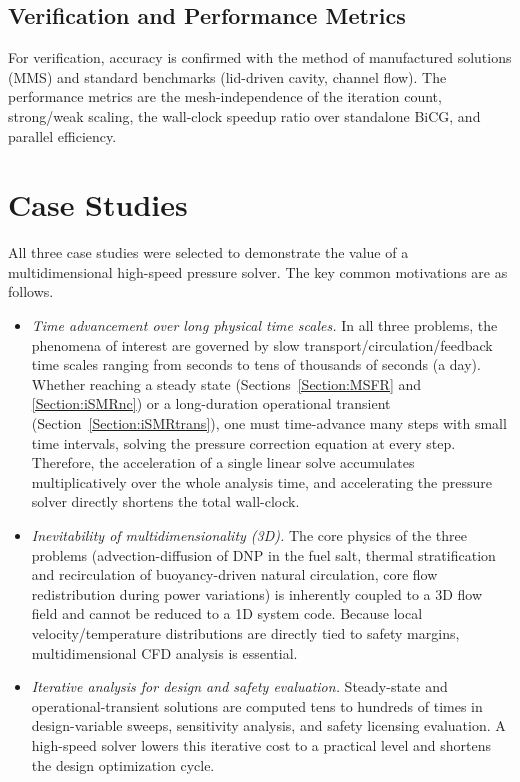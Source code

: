 \documentclass[review]{elsarticle}
\begin{document}
\subsection{Verification and Performance Metrics}
For verification, accuracy is confirmed with the method of manufactured solutions (MMS) and standard benchmarks (lid-driven cavity, channel flow). The performance metrics are the mesh-independence of the iteration count, strong/weak scaling, the wall-clock speedup ratio over standalone BiCG, and parallel efficiency.

\section{Case Studies}
\label{Section:CaseStudies}

All three case studies were selected to demonstrate the value of a multidimensional high-speed pressure solver. The key common motivations are as follows.
\begin{itemize}
  \item \emph{Time advancement over long physical time scales.} In all three problems, the phenomena of interest are governed by slow transport/circulation/feedback time scales ranging from seconds to tens of thousands of seconds (a day). Whether reaching a steady state (Sections~\ref{Section:MSFR} and \ref{Section:iSMRnc}) or a long-duration operational transient (Section~\ref{Section:iSMRtrans}), one must time-advance many steps with small time intervals, solving the pressure correction equation at every step. Therefore, the acceleration of a single linear solve accumulates multiplicatively over the whole analysis time, and accelerating the pressure solver directly shortens the total wall-clock.
  \item \emph{Inevitability of multidimensionality (3D).} The core physics of the three problems (advection-diffusion of DNP in the fuel salt, thermal stratification and recirculation of buoyancy-driven natural circulation, core flow redistribution during power variations) is inherently coupled to a 3D flow field and cannot be reduced to a 1D system code. Because local velocity/temperature distributions are directly tied to safety margins, multidimensional CFD analysis is essential.
  \item \emph{Iterative analysis for design and safety evaluation.} Steady-state and operational-transient solutions are computed tens to hundreds of times in design-variable sweeps, sensitivity analysis, and safety licensing evaluation. A high-speed solver lowers this iterative cost to a practical level and shortens the design optimization cycle.
\end{itemize}
\end{document}
